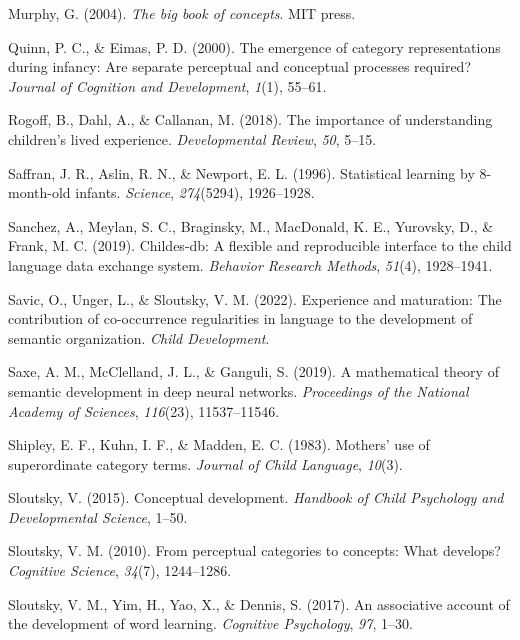 \documentclass[english,,man]{apa6}
\begin{document}
\leavevmode\hypertarget{ref-murphy2004big}{}%
Murphy, G. (2004). \emph{The big book of concepts}. MIT press.

\leavevmode\hypertarget{ref-quinn2000}{}%
Quinn, P. C., \& Eimas, P. D. (2000). The emergence of category representations during infancy: Are separate perceptual and conceptual processes required? \emph{Journal of Cognition and Development}, \emph{1}(1), 55--61.

\leavevmode\hypertarget{ref-rogoff2018}{}%
Rogoff, B., Dahl, A., \& Callanan, M. (2018). The importance of understanding children's lived experience. \emph{Developmental Review}, \emph{50}, 5--15.

\leavevmode\hypertarget{ref-saffran1996}{}%
Saffran, J. R., Aslin, R. N., \& Newport, E. L. (1996). Statistical learning by 8-month-old infants. \emph{Science}, \emph{274}(5294), 1926--1928.

\leavevmode\hypertarget{ref-sanchez2019}{}%
Sanchez, A., Meylan, S. C., Braginsky, M., MacDonald, K. E., Yurovsky, D., \& Frank, M. C. (2019). Childes-db: A flexible and reproducible interface to the child language data exchange system. \emph{Behavior Research Methods}, \emph{51}(4), 1928--1941.

\leavevmode\hypertarget{ref-savic2022experience}{}%
Savic, O., Unger, L., \& Sloutsky, V. M. (2022). Experience and maturation: The contribution of co-occurrence regularities in language to the development of semantic organization. \emph{Child Development}.

\leavevmode\hypertarget{ref-saxe2019mathematical}{}%
Saxe, A. M., McClelland, J. L., \& Ganguli, S. (2019). A mathematical theory of semantic development in deep neural networks. \emph{Proceedings of the National Academy of Sciences}, \emph{116}(23), 11537--11546.

\leavevmode\hypertarget{ref-shipley1983}{}%
Shipley, E. F., Kuhn, I. F., \& Madden, E. C. (1983). Mothers' use of superordinate category terms. \emph{Journal of Child Language}, \emph{10}(3).

\leavevmode\hypertarget{ref-sloutsky2015}{}%
Sloutsky, V. (2015). Conceptual development. \emph{Handbook of Child Psychology and Developmental Science}, 1--50.

\leavevmode\hypertarget{ref-sloutsky2010}{}%
Sloutsky, V. M. (2010). From perceptual categories to concepts: What develops? \emph{Cognitive Science}, \emph{34}(7), 1244--1286.

\leavevmode\hypertarget{ref-sloutsky2017}{}%
Sloutsky, V. M., Yim, H., Yao, X., \& Dennis, S. (2017). An associative account of the development of word learning. \emph{Cognitive Psychology}, \emph{97}, 1--30.
\end{document}
